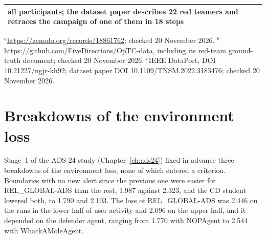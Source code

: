 \begin{table}[htbp]
\begin{tabularx}{\textwidth}{@{}>{\raggedright\arraybackslash}p{}l>{\raggedright\arraybackslash}X@{}}
  all participants; the dataset paper describes 22 red teamers and
  retraces the campaign of one of them in 18 steps \\
\bottomrule
\end{tabularx}
\par\smallskip
\begin{minipage}{\textwidth}\footnotesize{}
$^{a}$\url{https://zenodo.org/records/18861762}; checked 20 November 2026.
$^{b}$\url{https://github.com/FiveDirections/OpTC-data}, including its
red-team ground-truth document; checked 20 November 2026.
$^{c}$IEEE DataPort, DOI 10.21227/ngjr-kh92; dataset paper DOI
10.1109/TNSM.2022.3183476; checked 20 November 2026.
\end{minipage}
\end{table}

\section{Breakdowns of the environment loss}
\label{sec:ads24-breakdowns}

Stage~1 of the ADS-24 study (Chapter~\ref{ch:ads24}) fixed in advance
three breakdowns of the environment loss, none of which entered a criterion. Boundaries with no new alert since
the previous one were easier for REL\_GLOBAL-ADS than the rest, 1.987
against 2.323, and the CD student lowered both, to 1.790 and 2.103. The
loss of REL\_GLOBAL-ADS was 2.446 on the runs in the lower half of user
activity and 2.096 on the upper half, and it depended on the defender
agent, ranging from 1.770 with NOPAgent to 2.544 with WhackAMoleAgent.

